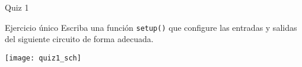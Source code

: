 \documentclass{beamer}
\begin{document}
\begin{frame}{Quiz 1}

\begin{block}{Ejercicio único}
Escriba una función \texttt{setup()} que configure las entradas y salidas del siguiente circuito de forma adecuada.
\end{block}

\begin{center}
\texttt{[image: quiz1\_sch]}
\end{center}

\end{frame}
\end{document}
